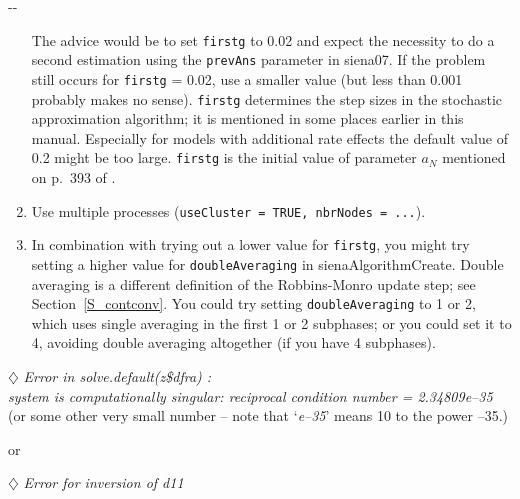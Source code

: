 \documentclass[a4paper,fleqn,11pt]{article}
\makeatletter
\newcommand{\+}{\, + \,}
\newenvironment{indentation}[2]
{\par \setlength{\leftmargin}{#1}       \setlength{\rightmargin}{#2}
  \advance\linewidth -\leftmargin       \advance\linewidth -\rightmargin
  \advance\@totalleftmargin\leftmargin  \@setpar{{\@@par}}%
  \parshape 1 \@totalleftmargin         \linewidth \ignorespaces}{\par}
\makeatother
\begin{document}
\begin{indentation}{0.04\textwidth}{0pt}
\begin{enumerate}
   The advice would be to set  \texttt{firstg}  to 0.02
   and expect the necessity to do a second estimation using the \texttt{prevAns}
   parameter in \textsf{siena07}. If the problem still occurs for \texttt{firstg} = 0.02,
   use a smaller value (but less than 0.001 probably makes no sense).
   \texttt{firstg} determines the step sizes in the stochastic approximation
   algorithm; it is mentioned in some places earlier in this manual.
   Especially for models with additional rate effects the default value of 0.2
   might be too large.
    \texttt{firstg}  is the initial value of parameter $a_N$ mentioned
    on p.\ 393 of \citet{Snijders01}.
\item Use multiple processes (\texttt{useCluster = TRUE, nbrNodes = ...}).
\item In combination with trying out a lower value for \texttt{firstg},
    you might try setting a higher value for  \texttt{doubleAveraging}
    in \textsf{sienaAlgorithmCreate}. Double averaging is a different definition
    of the Robbins-Monro update step; see Section~\ref{S_contconv}.
    You could try setting  \texttt{doubleAveraging} to 1 or 2, which uses
    single averaging in the first 1 or 2 subphases; or you could set it to
    4, avoiding double averaging altogether (if you have 4 subphases).
\end{enumerate}
\end{indentation}
\bigskip

\noindent $\diamondsuit$
\emph{Error in solve.default(z\$dfra) : \\
system is computationally singular: reciprocal condition number = 2.34809e--35
}\\
(or some other very small number -- note that `\textit{e--35}' means 10 to the power
--35.)
\smallskip

or
\smallskip

\noindent $\diamondsuit$
\emph{Error for inversion of d11}
\smallskip
\end{document}

